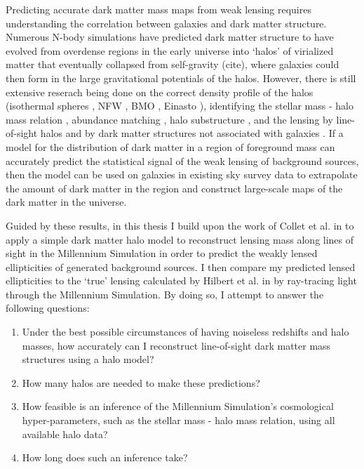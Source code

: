 \documentclass[%
 reprint,
 amsmath,amssymb,
 aps,nofootinbib
]{revtex4-1}
\begin{document}
Predicting accurate dark matter mass maps from weak lensing requires understanding the correlation between galaxies and dark matter structure. Numerous N-body simulations have predicted dark matter structure to have evolved from overdense regions in the early universe into `halos' of virialized matter that eventually collapsed from self-gravity (cite), where galaxies could then form in the large gravitational potentials of the halos. However, there is still extensive reserach being done on the correct density profile of the halos (isothermal spheres \cite{isothermal_spheres}, NFW \cite{nfw}, BMO \cite{bmo}, Einasto \cite{einasto}), identifying the stellar mass - halo mass relation \cite{smhr}, abundance matching \cite{reddick}, halo substructure \cite{substructure}, and the lensing by line-of-sight halos \cite{collet} and by dark matter structures not associated with galaxies \cite{mccully}. If a model for the distribution of dark matter in a region of foreground mass can accurately predict the statistical signal of the weak lensing of background sources, then the model can be used on galaxies in existing sky survey data to extrapolate the amount of dark matter in the region and construct large-scale maps of the dark matter in the universe.

Guided by these results, in this thesis I build upon the work of Collet et al. in \cite{collet} to apply a simple dark matter halo model to reconstruct lensing mass along lines of sight in the Millennium Simulation in order to predict the weakly lensed ellipticities of generated background sources. I then compare my predicted lensed ellipticities to the `true' lensing calculated by Hilbert et al. in \cite{ray_tracing} by ray-tracing light through the Millennium Simulation. By doing so, I attempt to answer the following questions: 

\begin{enumerate}
\item Under the best possible circumstances of having noiseless redshifts and halo masses, how accurately can I reconstruct line-of-sight dark matter mass structures using a halo model?
\item How many halos are needed to make these predictions?
\item How feasible is an inference of the Millennium Simulation's cosmological hyper-parameters, such as the stellar mass - halo mass relation, using all available halo data? 
\item How long does such an inference take?
\end{enumerate}
\end{document}
